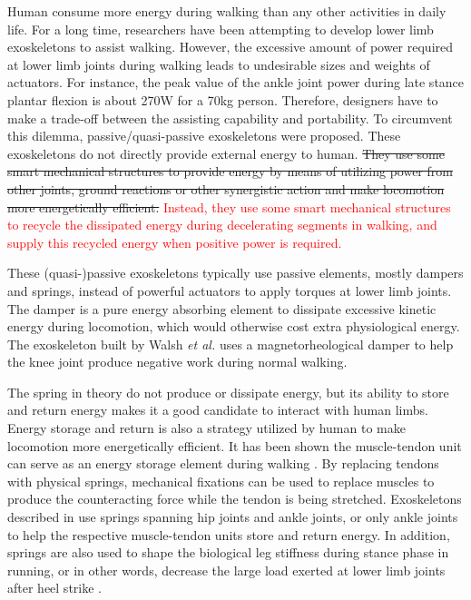 \documentclass[twocolumn,cleanfoot,10pt]{asme2ej}
\begin{document}
Human consume more energy during walking than any other activities in daily life.
For a long time, researchers have been attempting to develop lower limb exoskeletons to assist walking.
However, the excessive amount of power required at lower limb joints during walking leads to undesirable sizes and weights of actuators\cite{RN1}.
For instance, the peak value of the ankle joint power during late stance plantar flexion is about 270W for a 70kg person\cite{RN2}.
Therefore, designers have to make a trade-off between the assisting capability and portability.
To circumvent this dilemma, passive/quasi-passive exoskeletons were proposed\cite{RN3}.
These exoskeletons do not directly provide external energy to human.
\sout{They use some smart mechanical structures to provide energy by means of utilizing power from other joints, ground reactions or other synergistic action and make locomotion more energetically efficient.}
\textcolor{red}{Instead, they use some smart mechanical structures to recycle the dissipated energy during decelerating segments in walking, and supply this recycled energy when positive power is required.}

These (quasi-)passive exoskeletons typically use passive elements, mostly dampers and springs, instead of powerful actuators to apply torques at lower limb joints.
The damper is a pure energy absorbing element to dissipate excessive kinetic energy during locomotion, which would otherwise cost extra physiological energy\cite{negativework}.
The exoskeleton built by Walsh \emph{et al.} uses a magnetorheological damper to help the knee joint produce negative work during normal walking\cite{RN3}.

The spring in theory do not produce or dissipate energy, but its ability to store and return energy makes it a good candidate to interact with human limbs. 
Energy storage and return is also a strategy utilized by human to make locomotion more energetically efficient.
It has been shown the muscle-tendon unit can serve as an energy storage element during walking \cite{RN16,pays}.
By replacing tendons with physical springs, mechanical fixations can be used to replace muscles to produce the counteracting force while the tendon is being stretched.
Exoskeletons described in \cite{RN3,RN4,RN5} use springs spanning hip joints and ankle joints, or only ankle joints to help the respective muscle-tendon units store and return energy.
In addition, springs are also used to shape the biological leg stiffness during stance phase in running, or in other words, decrease the large load exerted at lower limb joints after heel strike \cite{RN6,RN7,RN8}.
\end{document}
